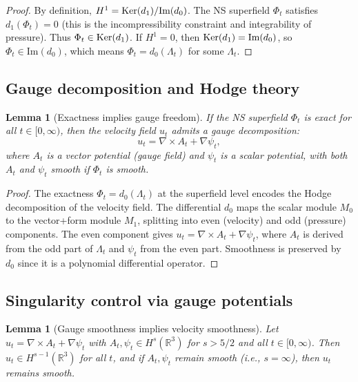 \documentclass[reqno,10pt]{amsart}
\theoremstyle{plain}
\newtheorem{lemma}[theorem]{Lemma}
\theoremstyle{definition}
\def\Ker{{\rm Ker}}
\begin{document}
\begin{proof}
By definition, $H^1 = \Ker(d_1)/\text{Im}(d_0)$. The NS superfield $\Phi_t$ satisfies $d_1(\Phi_t) = 0$ (this is the incompressibility constraint and integrability of pressure). Thus $\Phi_t \in \Ker(d_1)$. If $H^1=0$, then $\Ker(d_1) = \text{Im}(d_0)$, so $\Phi_t \in \text{Im}(d_0)$, which means $\Phi_t = d_0(\Lambda_t)$ for some $\Lambda_t$.
\end{proof}

\subsection{Gauge decomposition and Hodge theory}

\begin{lemma}[Exactness implies gauge freedom]\label{lem:gauge-freedom}
If the NS superfield $\Phi_t$ is exact for all $t\in[0,\infty)$, then the velocity field $u_t$ admits a gauge decomposition:
\[
  u_t = \nabla\times A_t + \nabla\psi_t,
\]
where $A_t$ is a vector potential (gauge field) and $\psi_t$ is a scalar potential, with both $A_t$ and $\psi_t$ smooth if $\Phi_t$ is smooth.
\end{lemma}

\begin{proof}
The exactness $\Phi_t = d_0(\Lambda_t)$ at the superfield level encodes the Hodge decomposition of the velocity field. The differential $d_0$ maps the scalar module $M_0$ to the vector+form module $M_1$, splitting into even (velocity) and odd (pressure) components. The even component gives $u_t = \nabla\times A_t + \nabla\psi_t$, where $A_t$ is derived from the odd part of $\Lambda_t$ and $\psi_t$ from the even part. Smoothness is preserved by $d_0$ since it is a polynomial differential operator.
\end{proof}

\subsection{Singularity control via gauge potentials}

\begin{lemma}[Gauge smoothness implies velocity smoothness]\label{lem:gauge-smooth}
Let $u_t = \nabla\times A_t + \nabla\psi_t$ with $A_t,\psi_t \in H^s(\mathbb{R}^3)$ for $s > 5/2$ and all $t\in[0,\infty)$. Then $u_t \in H^{s-1}(\mathbb{R}^3)$ for all $t$, and if $A_t,\psi_t$ remain smooth (i.e., $s=\infty$), then $u_t$ remains smooth.
\end{lemma}
\end{document}
